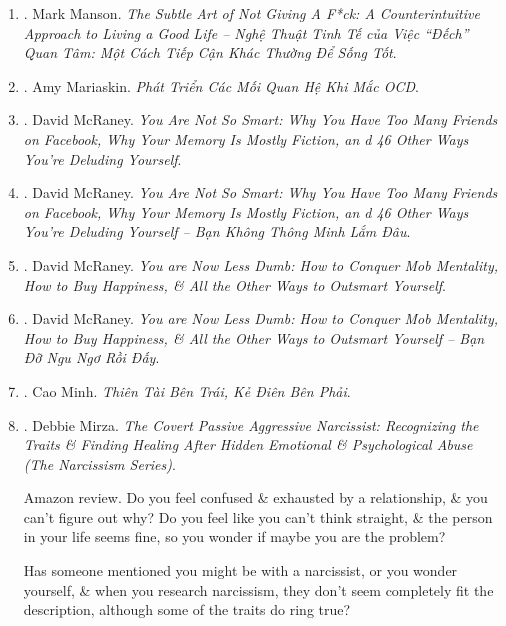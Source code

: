 \documentclass{article}
\begin{document}
\begin{enumerate}
	\item \cite{Manson_giving_fuck_vn}. Mark Manson. {\it The Subtle Art of Not Giving A F*ck: A Counterintuitive Approach to Living a Good Life -- Nghệ Thuật Tinh Tế của Việc ``Đếch'' Quan Tâm: Một Cách Tiếp Cận Khác Thường Để Sống Tốt}.\hfill{\sf[done]}

	\item \cite{Mariaskin_OCD}. Amy Mariaskin. {\it Phát Triển Các Mối Quan Hệ Khi Mắc OCD}.\hfill{\sf[done]}

	\item \cite{McRaney_not_smart}. {\sc David McRaney}. {\it You Are Not So Smart: Why You Have Too Many Friends on Facebook, Why Your Memory Is Mostly Fiction, an d 46 Other Ways You're Deluding Yourself}.

	\item \cite{McRaney_not_smart_VN}. {\sc David McRaney}. {\it You Are Not So Smart: Why You Have Too Many Friends on Facebook, Why Your Memory Is Mostly Fiction, an d 46 Other Ways You're Deluding Yourself -- Bạn Không Thông Minh Lắm Đâu}.\hfill{\sf[done]}

	\item \cite{McRaney_less_stupid}. {\sc David McRaney}. {\it You are Now Less Dumb: How to Conquer Mob Mentality, How to Buy Happiness, \& All the Other Ways to Outsmart Yourself}.

	\item \cite{McRaney_less_stupid_VN}. {\sc David McRaney}. {\it You are Now Less Dumb: How to Conquer Mob Mentality, How to Buy Happiness, \& All the Other Ways to Outsmart Yourself -- Bạn Đỡ Ngu Ngơ Rồi Đấy}.\hfill{\sf[done]}

	\item \cite{Minh2022}. Cao Minh. {\it Thiên Tài Bên Trái, Kẻ Điên Bên Phải}.\hfill{\sf[done]}

	\item \cite{Mirza_covert_passive_aggressive_narcissist}. {\sc Debbie Mirza}. {\it The Covert Passive Aggressive Narcissist: Recognizing the Traits \& Finding Healing After Hidden Emotional \& Psychological Abuse (The Narcissism Series)}. {}\hfill{\sf[done]}

	{\sf Amazon review.} Do you feel confused \& exhausted by a relationship, \& you can't figure out why? Do you feel like you can't think straight, \& the person in your life seems fine, so you wonder if maybe you are the problem?

	Has someone mentioned you might be with a narcissist, or you wonder yourself, \& when you research narcissism, they don't seem completely fit the description, although some of the traits do ring true?


\end{enumerate}
\end{document}
